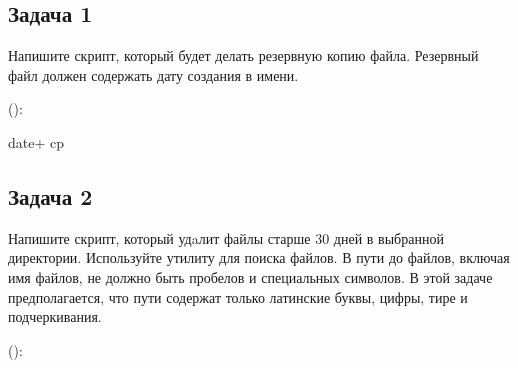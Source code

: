\documentclass[letterpaper,10pt,russian]{sphinxmanual}
\begin{document}
\subsection{Задача 1}
\label{\detokenize{educational_materials/bash/exercises:id2}}
\sphinxAtStartPar
Напишите скрипт, который будет делать резервную копию файла. Резервный файл должен содержать дату создания в имени.

\sphinxAtStartPar
{}

\sphinxAtStartPar
():

\begin{sphinxVerbatim}[commandchars=\\\{\}]
date+
cp
\end{sphinxVerbatim}


\subsection{Задача 2}
\label{\detokenize{educational_materials/bash/exercises:id3}}
\sphinxAtStartPar
Напишите скрипт, который удaлит файлы старше 30 дней в выбранной директории. Используйте утилиту  для поиска файлов. В пути до файлов, включая имя файлов, не должно быть пробелов и специальных символов. В этой задаче предполагается, что пути содержат только латинские буквы, цифры, тире и подчеркивания.

\sphinxAtStartPar
{}

\sphinxAtStartPar
():
\end{document}
